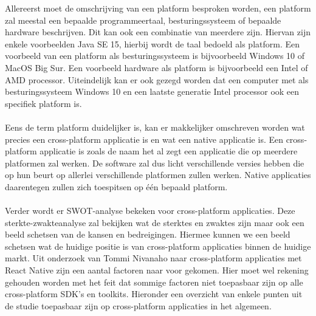 Allereerst moet de omschrijving van een platform besproken worden, een platform zal meestal een bepaalde programmeertaal, besturingssysteem of bepaalde hardware beschrijven. Dit kan ook een combinatie van meerdere zijn.\autocite{Bishop2006} Hiervan zijn enkele voorbeelden Java SE 15, hierbij wordt de taal bedoeld als platform. Een voorbeeld van een platform als besturingssysteem is bijvoorbeeld Windows 10 of MacOS Big Sur. Een voorbeeld hardware als platform is bijvoorbeeld een Intel of AMD processor. Uiteindelijk kan er ook gezegd worden dat een computer met als besturingssysteem Windows 10 en een laatste generatie Intel processor ook een specifiek platform is.
\\ \\
Eens de term platform duidelijker is, kan er makkelijker omschreven worden wat precies een cross-platform applicatie is en wat een native applicatie is. Een cross-platform applicatie is zoals de naam het al zegt een applicatie die op meerdere platformen zal werken. De software zal dus licht verschillende versies hebben die op hun beurt op allerlei verschillende platformen zullen werken. Native applicaties daarentegen zullen zich toespitsen op één bepaald platform.
\\ \\
Verder wordt er SWOT-analyse bekeken voor cross-platform applicaties. Deze sterkte-zwakteanalyse zal bekijken wat de sterktes en zwaktes zijn maar ook een beeld schetsen van de kansen en bedreigingen. Hiermee kunnen we een beeld schetsen wat de huidige positie is van cross-platform applicaties binnen de huidige markt. Uit onderzoek van Tommi Nivanaho naar cross-platform applicaties met React Native zijn een aantal factoren naar voor gekomen.\autocite{Nivanaho2019} Hier moet wel rekening gehouden worden met het feit dat sommige factoren niet toepasbaar zijn op alle cross-platform SDK’s en toolkits. Hieronder een overzicht van enkele punten uit de studie toepasbaar zijn op cross-platform applicaties in het algemeen.
\\
